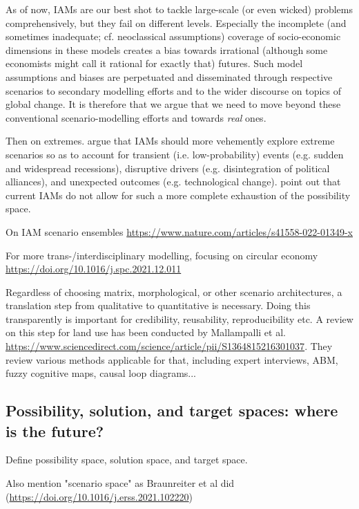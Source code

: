 \documentclass{article}
\begin{document}
\begin{refsection}
As of now, IAMs are our best shot to tackle large-scale (or even wicked) problems comprehensively, but they fail on different levels. Especially the incomplete (and sometimes inadequate; cf. neoclassical assumptions) coverage of socio-economic dimensions in these models creates a bias towards irrational (although some economists might call it rational for exactly that) futures. Such model assumptions and biases are perpetuated and disseminated through respective scenarios to secondary modelling efforts and to the wider discourse on topics of global change. It is therefore that we argue that we need to move beyond these conventional scenario-modelling efforts and towards \textit{real} ones.

Then on extremes.
\textcite{mccollum_2020} argue that IAMs should more vehemently explore extreme scenarios so as to account for transient (i.e. low-probability) events (e.g. sudden and widespread recessions), disruptive drivers (e.g. disintegration of political alliances), and unexpected outcomes (e.g. technological change). \textcite{gambhir_2022} point out that current IAMs do not allow for such a more complete exhaustion of the possibility space. 

On IAM scenario ensembles \url{https://www.nature.com/articles/s41558-022-01349-x}

For more trans-/interdisciplinary modelling, focusing on circular economy \url{https://doi.org/10.1016/j.spc.2021.12.011}

Regardless of choosing matrix, morphological, or other scenario architectures, a translation step from qualitative to quantitative is necessary. Doing this transparently is important for credibility, reusability, reproducibility etc. A review on this step for land use has been conducted by Mallampalli et al. \url{https://www.sciencedirect.com/science/article/pii/S1364815216301037}. They review various methods applicable for that, including expert interviews, ABM, fuzzy cognitive maps, causal loop diagrams...

\subsection{Possibility, solution, and target spaces: where is the future?}

Define possibility space, solution space, and target space.

Also mention "scenario space" as Braunreiter et al did (\url{https://doi.org/10.1016/j.erss.2021.102220})


\end{refsection}
\end{document}
